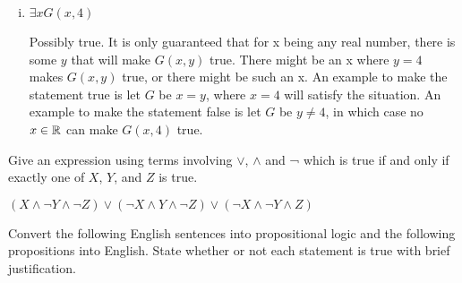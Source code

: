 \documentclass[11pt]{article}
\begin{document}
\begin{Parts}
\begin{enumerate}[(i)]
		\item $\exists x G(x,4)$
		
		\begin{Answer}
			Possibly true. It is only guaranteed that for x being any real number, there is 
			some $y$ that will make $G(x,y)$ true. There might be an x where $y=4$ makes $G(x,y)$
			true, or there might be such an x. An example to make the statement true is let $G$ be
			$x=y$, where $x=4$ will satisfy the situation. An example to make the statement false
			is let $G$ be $y \neq 4$, in which case no $x \in \mathbb{R}$ can make $G(x,4)$ true. 
		\end{Answer}
	\end{enumerate}
	
	\newpage
	\Part Give an expression using terms involving $\lor$, $\land$ and ¬ which is true if and only 
	if exactly one of $X$, $Y$, and $Z$ is true.

	\begin{Answer}
		$(X \land \neg Y \land \neg Z) \lor (\neg X \land Y \land \neg Z) \lor (\neg X \land \neg Y \land Z)$
	\end{Answer}
	
\end{Parts}

\newpage
{}

Convert the following English sentences into propositional logic and the following 
propositions into English. State whether or not each statement is true with brief justification. 
\end{document}
